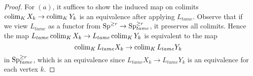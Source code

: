 \begin{proof}
	For $(a)$, it suffices to show the induced map on colimits
	$\operatorname{colim}_{K}X_k \to \operatorname{colim}_{K}Y_k$ is an equivalence after applying $L_{tame}$.
	Observe that if we view $L_{tame}$ as a functor from $\operatorname{Sp}^{\geq r}\to \operatorname{Sp}_{tame}^{\geq r}$, it preserves all colimits.
	Hence the map $L_{tame}\operatorname{colim}_{K}X_k \to L_{tame}\operatorname{colim}_{K}Y_k$ is equivalent to the map 
	$$
	\operatorname{colim}_{K}L_{tame}X_k \to \operatorname{colim}_{K}L_{tame}Y_k
	$$
	in $\operatorname{Sp}_{tame}^{\geq r}$, which is an equivalence since $L_{tame}X_k \to L_{tame}Y_k$ is an equivalence for each vertex $k$.
	
	
\end{proof}


